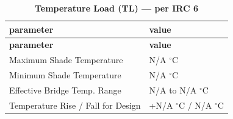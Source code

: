 \documentclass[12pt,a4paper]{report}
\numberwithin{table}{chapter}
\numberwithin{figure}{chapter}
\newcommand{\ReportTableSetup}{%
  \setlength{\tabcolsep}{3.0pt}%
  \renewcommand{\arraystretch}{1.18}%
  \setlength{\arrayrulewidth}{0.4pt}\setlength{\extrarowheight}{0.5pt}%
  \setlength{\LTleft}{\fill}\setlength{\LTright}{\fill}%
  \setlength{\LTpre}{4pt}\setlength{\LTpost}{8pt}}
\newcommand{\ReportTableFont}{\small}
\newcommand{\ReportRowGap}{3.0pt}
\newcommand{\ReportTableGap}{\vspace{0.5em}}
\begin{document}
\ReportTableGap
\begingroup
\ReportTableSetup
\ReportTableFont
\begin{longtable}{|L{5.5000cm}|p{10.0000cm}|}
\caption{\textbf{Temperature Load (TL) --- per IRC 6}}\\
\hline
\textbf{parameter} & \textbf{value} \\
\hline
\endfirsthead
\hline
\textbf{parameter} & \textbf{value} \\
\hline
\endhead
\hline
\endfoot
\hline
\endlastfoot

\textnormal{Maximum Shade Temperature} & N/A $^\circ$C \\[\ReportRowGap]
\hline
\textnormal{Minimum Shade Temperature} & N/A $^\circ$C \\[\ReportRowGap]
\hline
\textnormal{Effective Bridge Temp. Range} & N/A to N/A $^\circ$C \\[\ReportRowGap]
\hline
\textnormal{Temperature Rise / Fall for Design} & +N/A $^\circ$C / \textminus{}N/A $^\circ$C \\[\ReportRowGap]
\hline
\end{longtable}
\endgroup
\end{document}
